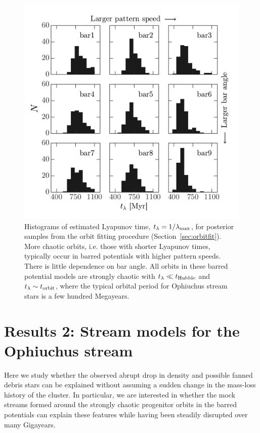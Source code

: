 \documentclass[letterpaper,12pt,preprint]{aastex}
\newcommand{\lyapexp}{\lambda_{\rm max}}
\newcommand{\lyapt}{t_\lambda}
\begin{document}
\begin{figure}[!tbp]
\begin{center}
\includegraphics[width=\textwidth]{figures/lyapunov-hist}
\caption{ Histograms of estimated Lyapunov time, $\lyapt=1/\lyapexp$, for posterior samples from the orbit fitting procedure (Section~\ref{sec:orbitfit}). More chaotic orbits, i.e. those with shorter Lyapunov times, typically occur in barred potentials with higher pattern speeds. There is little dependence on bar angle. All orbits in these barred potential models are strongly chaotic with $t_\lambda \ll t_{\rm Hubble}$ and $t_\lambda \sim t_{\rm orbit}$, where the typical orbital period for Ophiuchus stream stars is a few hundred Megayears.}
\label{fig:lyapunov-hist}
\end{center}
\end{figure}

\section{Results 2: Stream models for the Ophiuchus stream}\label{sec:results2}

Here we study whether the observed abrupt drop in density and possible fanned debris stars can be explained without assuming a sudden change in the mass-loss history of the cluster. In particular, we are interested in whether the mock streams formed around the strongly chaotic progenitor orbits in the barred potentials can explain these features while having been steadily disrupted over many Gigayears.
\end{document}
